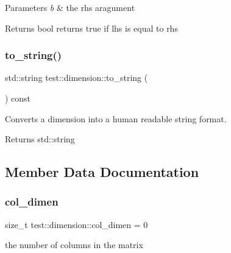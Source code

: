\begin{DoxyParams}{Parameters}
{\em b} & the rhs aragument \\
\hline
\end{DoxyParams}
\begin{DoxyReturn}{Returns}
bool returns true if lhs is equal to rhs 
\end{DoxyReturn}
\mbox{\label{structtest_1_1dimension_ae48ed76d2d21cabf12ee2473b50ef9cd}} 
\subsubsection{\texorpdfstring{to\_string()}{to\_string()}}
{\footnotesize\ttfamily std\+::string test\+::dimension\+::to\+\_\+string (\begin{DoxyParamCaption}{ }\end{DoxyParamCaption}) const\hspace{0.3cm}{\ttfamily [inline]}}



Converts a dimension into a human readable string format. 

\begin{DoxyReturn}{Returns}
std\+::string 
\end{DoxyReturn}


\subsection{Member Data Documentation}
\mbox{\label{structtest_1_1dimension_afdf8e5f0709b3e8cfdbb77f9896b03cf}} 
\subsubsection{\texorpdfstring{col\_dimen}{col\_dimen}}
{\footnotesize\ttfamily size\+\_\+t test\+::dimension\+::col\+\_\+dimen = 0}



the number of columns in the matrix 

\mbox{\label{structtest_1_1dimension_ad7dc1556e02d9dfadc5921ce76933ba9}} 
